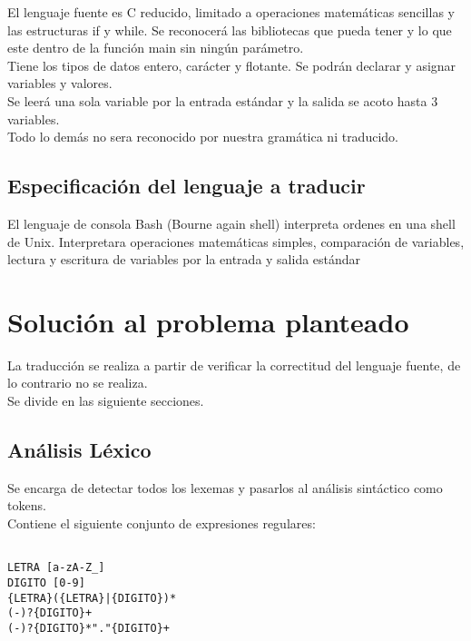 \documentclass[aspectratio=169]{article}
\begin{document}
	El lenguaje fuente es C reducido, limitado a operaciones matemáticas sencillas y las estructuras
	if y while. Se reconocerá las bibliotecas que pueda tener y lo que este dentro de la función
	main sin ningún par\'ametro. \\

	Tiene los tipos de datos entero, carácter y flotante. Se podrán declarar y asignar variables y valores.\\

	Se leerá una sola variable por la entrada estándar y la salida se acoto hasta 3 variables. \\

	Todo lo demás no sera reconocido por nuestra gramática ni traducido.

\subsection{Especificaci\'on del lenguaje a traducir}

El lenguaje de consola Bash (Bourne again shell) interpreta ordenes en una shell de Unix.
Interpretara operaciones matemáticas simples, comparación de variables, lectura y escritura de variables
por la entrada y salida estándar

\section{Soluci\'on al problema planteado}

La traducción se realiza a partir de verificar la correctitud del lenguaje fuente, de lo contrario
no se realiza.\\

Se divide en las siguiente secciones.

\subsection{An\'alisis L\'exico}

Se encarga de detectar todos los lexemas y pasarlos al análisis sintáctico como tokens.\\
Contiene el siguiente conjunto de expresiones regulares:\\

\begin{lstlisting}

LETRA [a-zA-Z_]
DIGITO [0-9]
{LETRA}({LETRA}|{DIGITO})*
(-)?{DIGITO}+
(-)?{DIGITO}*"."{DIGITO}+

\end{lstlisting}
\end{document}
